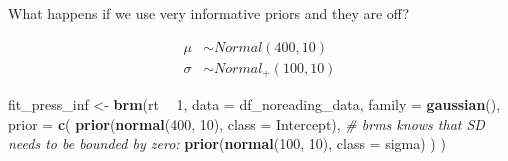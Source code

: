 \documentclass[12pt,ignorenonframetext,aspectratio=169]{beamer}
\newenvironment{Shaded}{\begin{snugshade}}{\end{snugshade}}
\newcommand{\CommentTok}[1]{\textcolor[rgb]{0.56,0.35,0.01}{\textit{#1}}}
\newcommand{\DataTypeTok}[1]{\textcolor[rgb]{0.13,0.29,0.53}{#1}}
\newcommand{\DecValTok}[1]{\textcolor[rgb]{0.00,0.00,0.81}{#1}}
\newcommand{\KeywordTok}[1]{\textcolor[rgb]{0.13,0.29,0.53}{\textbf{#1}}}
\newcommand{\NormalTok}[1]{#1}
\newcommand{\OperatorTok}[1]{\textcolor[rgb]{0.81,0.36,0.00}{\textbf{#1}}}
\newcommand{\StringTok}[1]{\textcolor[rgb]{0.31,0.60,0.02}{#1}}
\begin{document}
\begin{frame}[fragile]

\begin{block}{What happens if we use very informative priors and they are off?}

\begin{equation}
\begin{aligned}
\mu &\sim Normal(400, 10) \\
\sigma &\sim Normal_+(100, 10) 
\end{aligned}
\label{eq:infrtpriors}
\end{equation}

\small

\begin{Shaded}
\begin{Highlighting}[]
\NormalTok{fit_press_inf <-}\StringTok{ }\KeywordTok{brm}\NormalTok{(rt }\OperatorTok{~}\StringTok{ }\DecValTok{1}\NormalTok{,}
  \DataTypeTok{data =}\NormalTok{ df_noreading_data,}
  \DataTypeTok{family =} \KeywordTok{gaussian}\NormalTok{(),}
  \DataTypeTok{prior =} \KeywordTok{c}\NormalTok{(}
    \KeywordTok{prior}\NormalTok{(}\KeywordTok{normal}\NormalTok{(}\DecValTok{400}\NormalTok{, }\DecValTok{10}\NormalTok{), }\DataTypeTok{class =}\NormalTok{ Intercept),}
    \CommentTok{# brms knows that SD needs to be bounded by zero:}
    \KeywordTok{prior}\NormalTok{(}\KeywordTok{normal}\NormalTok{(}\DecValTok{100}\NormalTok{, }\DecValTok{10}\NormalTok{), }\DataTypeTok{class =}\NormalTok{ sigma)}
\NormalTok{  )}
\NormalTok{)}
\end{Highlighting}
\end{Shaded}

\normalsize

\end{block}

\end{frame}
\end{document}
